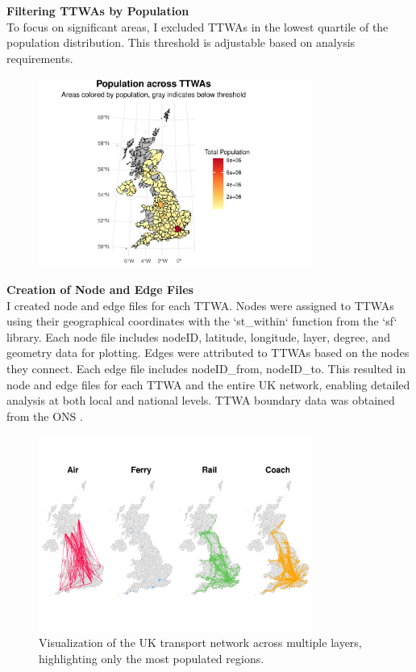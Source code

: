 \noindent \textbf{Filtering TTWAs by Population} \\
To focus on significant areas, I excluded TTWAs in the lowest quartile of the population distribution. This threshold is adjustable based on analysis requirements.
\begin{figure}[H]
	\centering
	\includegraphics[width=0.8\textwidth]{images/LowedPopulationTTWAs.pdf}
\end{figure}

\noindent \textbf{Creation of Node and Edge Files} \\
I created node and edge files for each TTWA. Nodes were assigned to TTWAs using their geographical coordinates with the `st\_within` function from the `sf` library. Each node file includes nodeID, latitude, longitude, layer, degree, and geometry data for plotting. Edges were attributed to TTWAs based on the nodes they connect. Each edge file includes nodeID\_from, nodeID\_to. This resulted in node and edge files for each TTWA and the entire UK network, enabling detailed analysis at both local and national levels. TTWA boundary data was obtained from the ONS \cite{ttwa_boundary_data}.

\vspace{-1cm}
\begin{figure}[H]
	\centering
	\includegraphics[width=0.8\textwidth]{images/multilayer_network_uk.pdf}
	\caption{Visualization of the UK transport network across multiple layers, highlighting only the most populated regions.}
\end{figure}

